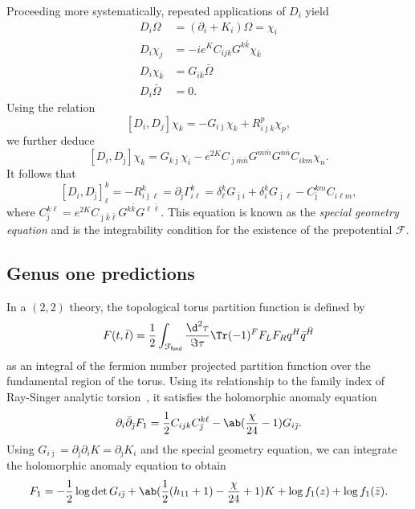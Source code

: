 \documentclass[10pt,oldfontcommands,oneside]{memoir}
\theoremstyle{definition}
\theoremstyle{remark}
\theoremstyle{plain}
\theoremstyle{definition}
\theoremstyle{remark}
\newcommand{\mc}[1]{\mathcal{#1}}
\newcommand{\ms}[1]{\mathsf{#1}}
\newcommand{\1}{\mathbf{1}}
\newcommand{\2}{\mathbf{2}}
\newcommand{\3}{\mathbf{3}}
\begin{document}
Proceeding more systematically, repeated applications of $D_i$ yield
\begin{align*}
    D_i \Omega &= (\partial_i + K_i)\Omega = \chi_i \\
    D_i \chi_j &= -ie^{K} C_{ijk} G^{k\bar{k}}\chi_{\bar{k}} \\
    D_i \chi_{\bar{k}} &= G_{i\bar{k}} \bar{\Omega} \\
    D_i \bar{\Omega} &= 0.
\end{align*}
Using the relation
\[ [D_i, D_j] \chi_k = -G_{i\bar{\jmath}} \chi_k + R_{i\bar{\jmath}k}^p \chi_p, \]
we further deduce
\[ [D_i, D_{\bar{\jmath}}] \chi_k  = G_{k\bar{\jmath}} \chi_i - e^{2K} C_{\bar{\jmath}\bar{m}\bar{n}} G^{m\bar{m}} G^{n\bar{n}} C_{ikm} \chi_n. \]
It follows that
\[ [D_i, D_{\bar{\jmath}}]_{\ell}^k = -R_{i\bar{\jmath}\ell}^k = \partial_{\bar{\jmath}} \Gamma_{i\ell}^k = \delta_{\ell}^k G_{\bar{\jmath}i} + \delta_i^k G_{\bar{\jmath}\ell} - C_{\bar{\jmath}}^{km} C_{i\ell m}, \]
where $C_{\bar{\jmath}}^{k\ell} = e^{2K} C_{\bar{\jmath}\bar{k}\bar{\ell}} G^{k\bar{k}} G^{\ell\bar{\ell}}$. This equation is known as the \textit{special geometry equation} and is the integrability condition for the existence of the prepotential $\mc{F}$.

\subsection{Genus one predictions}%
\label{sub:Genus one predictions}

In a $(2,2)$ theory, the topological torus partition function is defined by
\[ F(t, \bar{t}) = \frac{1}{2} \int_{\mc{F}_{\ms{fund}}} \frac{\d^2 \tau}{\Im \tau} \Tr(-1)^F F_L F_R q^H \bar{q}^{\bar{H}} \]
as an integral of the fermion number projected partition function over the fundamental region of the torus. Using its relationship to the family index of Ray-Singer analytic torsion~\cite{analytictorsion}, it satisfies the holomorphic anomaly equation
\[ \partial_i \bar{\partial}_{\bar{\jmath}} F_1 = \frac{1}{2} C_{ijk} C_{\bar{\jmath}}^{k\ell} - \ab(\frac{\chi}{24}-1) G_{i\bar{\jmath}}. \]
Using $G_{i\bar{\jmath}} = \partial_{\bar{\jmath}} \partial_i K = \partial_{\bar{\jmath}} K_i$ and the special geometry equation, we can integrate the holomorphic anomaly equation to obtain
\begin{equation}\label{eqn:f1}
 F_1 = -\frac{1}{2} \log \det G_{i\bar{\jmath}} + \ab(\frac{1}{2}(h_{11}+1) - \frac{\chi}{24} + 1)K + \log f_1(z) + \log f_1(\bar{z}). 
\end{equation}
\end{document}
